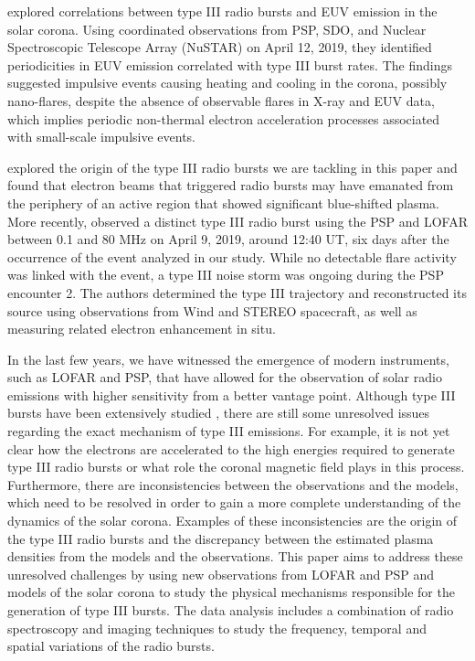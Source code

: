 \cite{cattell_2021} explored correlations between type III radio bursts and EUV emission in the solar corona. Using coordinated observations from PSP, SDO, and Nuclear Spectroscopic Telescope Array (NuSTAR) on April 12, 2019, they identified periodicities in EUV emission correlated with type III burst rates. The findings suggested impulsive events causing heating and cooling in the corona, possibly nano-flares, despite the absence of observable flares in X-ray and EUV data, which implies periodic non-thermal electron acceleration processes associated with small-scale impulsive events.

\cite{harra_2021} explored the origin of the type III radio bursts we are tackling in this paper and found that electron beams that triggered radio bursts may have emanated from the periphery of an active region that showed significant blue-shifted plasma.
More recently, \cite{badman_2022} observed a distinct type III radio burst using the PSP and LOFAR between 0.1 and 80 MHz on April 9, 2019, around 12:40 UT, six days after the occurrence of the event analyzed in our study. While no detectable flare activity was linked with the event, a type III noise storm was ongoing during the PSP encounter 2. The authors determined the type III trajectory and reconstructed its source using observations from Wind and STEREO spacecraft, as well as measuring related electron enhancement in situ.

In the last few years, we have witnessed the emergence of modern instruments, such as LOFAR and PSP, that have allowed for the observation of solar radio emissions with higher sensitivity from a better vantage point. Although type III bursts have been extensively studied \cite{dabrowski_2021}, there are still some unresolved issues regarding the exact mechanism of type III emissions.
For example, it is not yet clear how the electrons are accelerated to the high energies required to generate type III radio bursts or what role the coronal magnetic field plays in this process.
Furthermore, there are inconsistencies between the observations and the models, which need to be resolved in order to gain a more complete understanding of the dynamics of the solar corona. Examples of these inconsistencies are the origin of the type III radio bursts and the discrepancy between the estimated plasma densities from the models and the observations. This paper aims to address these unresolved challenges by using new observations from LOFAR and PSP and models of the solar corona to study the physical mechanisms responsible for the generation of type III bursts.
The data analysis includes a combination of radio spectroscopy and imaging techniques to study the frequency, temporal and spatial variations of the radio bursts. 

